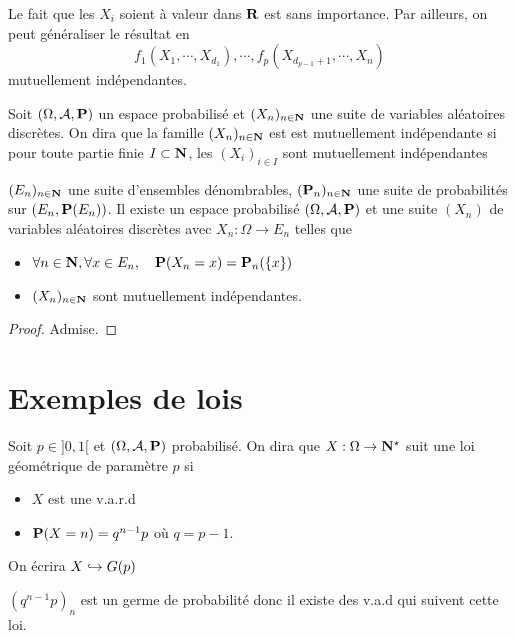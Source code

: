 \begin{rem}
    Le fait que les $X_i$ soient à valeur dans  $\R$ est sans importance. Par ailleurs, on peut généraliser le résultat en \[
        f_1(X_1,\cdots ,X_{d_1}),\cdots ,f_p(X_{d_{p-1}+1},\cdots ,X_n)
    \] 
    mutuellement indépendantes.
\end{rem}

\begin{dfn}
    Soit $(\Omega, \mathcal A, \P)$ un espace probabilisé et $(X_n)_{n\in \N}$ une suite de variables aléatoires discrètes. On dira que la famille $(X_n)_{n\in \N}$ est est mutuellement indépendante si pour toute partie finie $I\subset \N$, les $(X_i)_{i\in I}$ sont mutuellement indépendantes
\end{dfn}

\begin{thm}
    \Hyp $(E_n)_{n\in \N}$ une suite d'ensembles dénombrables, $(\P_n)_{n\in \N}$ une suite de probabilités sur $(E_n, \mathcal \P(E_n))$.
    \Conc Il existe un espace probabilisé $(\Omega, \mathcal A, \P)$ et une suite $(X_n)$ de variables aléatoires discrètes avec  $X_n:\Omega\to E_n$ telles que \begin{itemize}
        \item $\forall n\in \N,\forall x\in E_n,\quad \P(X_n=x)=\P_n(\{x\} )$
        \item $(X_n)_{n\in \N}$ sont mutuellement indépendantes.
    \end{itemize}
\end{thm}

\begin{proof}
    Admise.
\end{proof}

\section{Exemples de lois}

\begin{dfn}
    Soit $p\in ]0,1[$ et $(\Omega,\mathcal  A,\P)$ probabilisé. On dira que $X:\Omega\to \N^\star$ suit une loi géométrique de paramètre $p$ si \begin{itemize}
        \item $X$ est une v.a.r.d
        \item $\P(X=n)=q^{n-1}p$ où $q=p-1$.
    \end{itemize}
    On écrira $X\suit G(p)$
\end{dfn}

\begin{rem}
    $(q^{n-1}p)_n$ est un germe de probabilité donc il existe des v.a.d qui suivent cette loi.
\end{rem}

